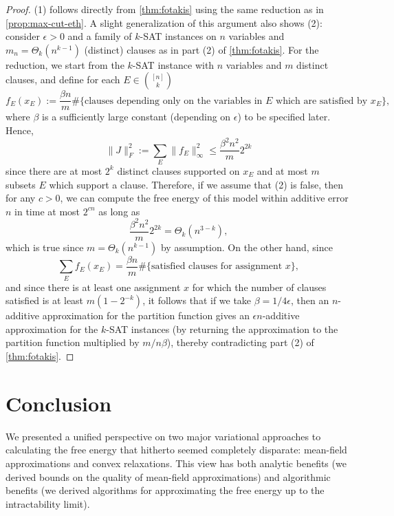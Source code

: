 \documentclass[11pt, oneside, english]{article}
\theoremstyle{definition}
\theoremstyle{plain}
\begin{document}
\begin{proof}
(1) follows directly from \cref{thm:fotakis} using the same reduction as in \cref{prop:max-cut-eth}. A slight generalization of this argument also shows (2): consider $\epsilon > 0$ and a family of $k$-SAT instances on $n$ variables and $m_n = \Theta_k(n^{k-1})$ (distinct) clauses as in part (2) of \cref{thm:fotakis}. For the reduction, we start from the $k$-SAT instance with $n$ variables and $m$ distinct clauses, and define for each $E \in \binom{[n]}{k}$ 
\[ f_E(x_E) := \frac{\beta n}{m} \#\{\text{clauses depending only on the variables in $E$ which are satisfied by $x_E$}\}, \]
where $\beta$ is a sufficiently large constant (depending on $\epsilon$) to be specified later. 
Hence,
\[ \|J\|_F^2 := \sum_E \|f_E\|_{\infty}^2 \le \frac{\beta^2 n^2}{m} 2^{2k} \]
since there are at most $2^k$ distinct clauses supported on $x_E$ and at most $m$ subsets $E$ which support a clause. 
Therefore, if we assume that (2) is false, then for any $c > 0$, we can compute the free energy of this model within additive error $n$ in time at most $2^{cn}$ as long as 
\[ \frac{\beta^2 n^2}{m} 2^{2k} = \Theta_k(n^{3 - k}), \]
which is true since $m = \Theta_k(n^{k - 1})$ by assumption. On the other hand, since 
$$\sum_E f_E(x_E) = \frac{\beta n}{m} \#\{\text{satisfied clauses for assignment $x$}\},$$
and since there is at least one assignment $x$ for which the number of clauses satisfied is at least $m(1-2^{-k}) $, it follows that if we take $\beta = 1/4\epsilon$, then an $n$-additive approximation for the partition function gives an $\epsilon n$-additive approximation for the $k$-SAT instances (by returning the approximation to the partition function multiplied by $m/n\beta$), thereby contradicting part (2) of \cref{thm:fotakis}. 

\end{proof}
\section{Conclusion}

We presented a unified perspective on two major variational approaches to calculating the free energy that hitherto seemed completely disparate: mean-field approximations and convex relaxations. This view has both analytic benefits (we derived bounds on the quality of mean-field approximations) and algorithmic benefits (we derived algorithms for approximating the free energy up to the intractability limit).  
\end{document}
